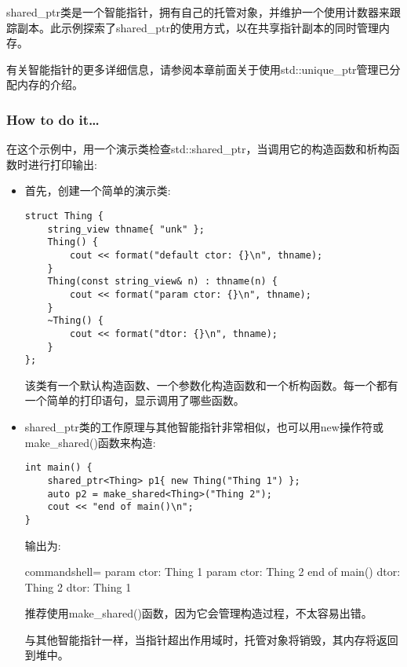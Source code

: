 
shared\_ptr类是一个智能指针，拥有自己的托管对象，并维护一个使用计数器来跟踪副本。此示例探索了shared\_ptr的使用方式，以在共享指针副本的同时管理内存。

\begin{tcolorbox}[colback=webgreen!5!white,colframe=webgreen!75!black,title=Note]
有关智能指针的更多详细信息，请参阅本章前面关于使用std::unique\_ptr管理已分配内存的介绍。
\end{tcolorbox}

\subsubsection{How to do it…}

在这个示例中，用一个演示类检查std::shared\_ptr，当调用它的构造函数和析构函数时进行打印输出:

\begin{itemize}
\item 
首先，创建一个简单的演示类:

\begin{lstlisting}[style=styleCXX]
struct Thing {
	string_view thname{ "unk" };
	Thing() {
		cout << format("default ctor: {}\n", thname);
	}
	Thing(const string_view& n) : thname(n) {
		cout << format("param ctor: {}\n", thname);
	}
	~Thing() {
		cout << format("dtor: {}\n", thname);
	}
};
\end{lstlisting}

该类有一个默认构造函数、一个参数化构造函数和一个析构函数。每一个都有一个简单的打印语句，显示调用了哪些函数。

\item 
shared\_ptr类的工作原理与其他智能指针非常相似，也可以用new操作符或make\_shared()函数来构造:

\begin{lstlisting}[style=styleCXX]
int main() {
	shared_ptr<Thing> p1{ new Thing("Thing 1") };
	auto p2 = make_shared<Thing>("Thing 2");
	cout << "end of main()\n";
}
\end{lstlisting}

输出为:

\begin{tcblisting}{commandshell={}}
param ctor: Thing 1
param ctor: Thing 2
end of main()
dtor: Thing 2
dtor: Thing 1
\end{tcblisting}

推荐使用make\_shared()函数，因为它会管理构造过程，不太容易出错。

与其他智能指针一样，当指针超出作用域时，托管对象将销毁，其内存将返回到堆中。


\end{itemize}

